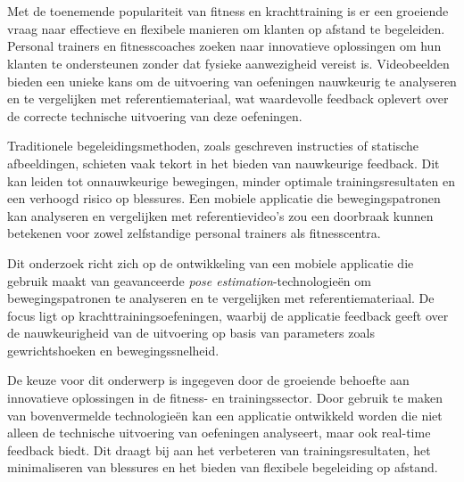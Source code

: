 
\chapter{}%
\label{ch:inleiding}

Met de toenemende populariteit van fitness en krachttraining is er een groeiende vraag naar effectieve en flexibele manieren om klanten op afstand te begeleiden. 
Personal trainers en fitnesscoaches zoeken naar innovatieve oplossingen om hun klanten te ondersteunen zonder dat fysieke aanwezigheid vereist is. 
Videobeelden bieden een unieke kans om de uitvoering van oefeningen nauwkeurig te analyseren en te vergelijken met referentiemateriaal, wat waardevolle feedback oplevert over de correcte technische uitvoering van deze oefeningen.

\medskip

Traditionele begeleidingsmethoden, zoals geschreven instructies of statische afbeeldingen, schieten vaak tekort in het bieden van nauwkeurige feedback. 
Dit kan leiden tot onnauwkeurige bewegingen, minder optimale trainingsresultaten en een verhoogd risico op blessures. 
Een mobiele applicatie die bewegingspatronen kan analyseren en vergelijken met referentievideo’s zou een doorbraak kunnen betekenen voor zowel zelfstandige personal trainers als fitnesscentra.

\medskip

Dit onderzoek richt zich op de ontwikkeling van een mobiele applicatie die gebruik maakt van geavanceerde \textit{pose estimation}-technologieën om bewegingspatronen te analyseren en te vergelijken met referentiemateriaal. De focus ligt op krachttrainingsoefeningen, waarbij de applicatie feedback geeft over de nauwkeurigheid van de uitvoering op basis van parameters zoals gewrichtshoeken en bewegingssnelheid.

\medskip

De keuze voor dit onderwerp is ingegeven door de groeiende behoefte aan innovatieve oplossingen in de fitness- en trainingssector. Door gebruik te maken van bovenvermelde technologieën kan een applicatie ontwikkeld worden die niet alleen de technische uitvoering van oefeningen analyseert, maar ook real-time feedback biedt. Dit draagt bij aan het verbeteren van trainingsresultaten, het minimaliseren van blessures en het bieden van flexibele begeleiding op afstand.


